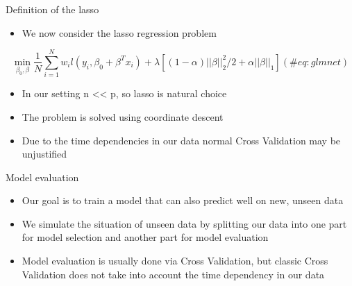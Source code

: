 \documentclass[
  ignorenonframetext,
]{beamer}
\providecommand{\tightlist}{%
  \setlength{\itemsep}{0pt}\setlength{\parskip}{0pt}}
\begin{document}
\begin{frame}{Definition of the lasso}
\protect\hypertarget{definition-of-the-lasso}{}
\begin{itemize}
\tightlist
\item
  We now consider the lasso regression problem
\end{itemize}

\begin{equation}
\min_{\beta_0, \beta} \frac{1}{N} \sum_{i=1}^N w_il(y_i,\beta_0 + \beta^Tx_i) + \lambda [(1-\alpha)||\beta||_2^2/2 + \alpha||\beta||_1] (\#eq:glmnet)
\end{equation}

\begin{itemize}
\tightlist
\item
  In our setting n \textless\textless{} p, so lasso is natural choice
\item
  The problem is solved using coordinate descent
\item
  Due to the time dependencies in our data normal Cross Validation may
  be unjustified
\end{itemize}
\end{frame}

\begin{frame}{Model evaluation}
\protect\hypertarget{model-evaluation}{}
\begin{itemize}
\tightlist
\item
  Our goal is to train a model that can also predict well on new, unseen
  data
\item
  We simulate the situation of unseen data by splitting our data into
  one part for model selection and another part for model evaluation
\item
  Model evaluation is usually done via Cross Validation, but classic
  Cross Validation does not take into account the time dependency in our
  data
\end{itemize}
\end{frame}
\end{document}

